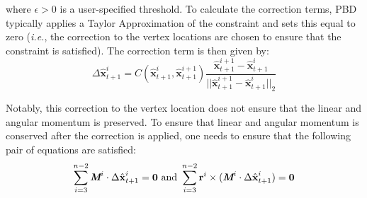 where $\epsilon > 0$ is a user-specified threshold.
To calculate the correction terms, PBD typically applies a Taylor Approximation of the constraint and sets this equal to zero (\textit{i.e.}, the correction to the vertex locations are chosen to ensure that the constraint is satisfied).
The correction term is then given by:
\reducevspacebefore
\begin{equation}
    \label{eq:inext1}
    \Delta \hat{\textbf{x}}^i_{t+1} = C(\hat{\textbf{x}}^i_{t+1},\hat{\textbf{x}}^{i+1}_{t+1})\frac{\hat{\textbf{x}}^{i+1}_{t+1} - \hat{\textbf{x}}^{i}_{t+1}}{||\hat{\textbf{x}}^{i+1}_{t+1} - \hat{\textbf{x}}^{i}_{t+1}||_2}
\end{equation}
\vspace{-10pt}


Notably, this correction to the vertex location does not ensure that the linear and angular momentum is preserved.
\Revise{}{}To ensure that linear and angular momentum is conserved after the correction is applied, one needs to ensure that the following pair of equations are satisfied:
\reducevspacebefore
\begin{equation}
    \label{eq:momentum} 
    \sum_{i=3}^{n-2} \textit{\textbf{M}}^i \cdot \Delta \hat{\textbf{x}}^i_{t+1} = \textbf{0} \text{ and } 
    \sum_{i=3}^{n-2} \textbf{r}^i \times (\textit{\textbf{M}}^i \cdot \Delta \hat{\textbf{x}}^i_{t+1}) = \textbf{0}
\end{equation}
\reducevspaceafter



